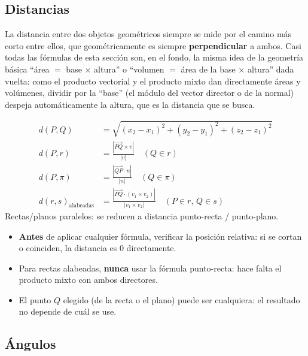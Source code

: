 \documentclass[11pt,a4paper]{article}
\begin{document}
\subsection{Distancias}

\begin{intuicion}
La distancia entre dos objetos geométricos siempre se mide por el camino más corto entre
ellos, que geométricamente es siempre \textbf{perpendicular} a ambos. Casi todas las
fórmulas de esta sección son, en el fondo, la misma idea de la geometría básica ``área
$=$ base $\times$ altura'' o ``volumen $=$ área de la base $\times$ altura'' dada vuelta:
como el producto vectorial y el producto mixto dan directamente áreas y volúmenes,
dividir por la ``base'' (el módulo del vector director o de la normal) despeja
automáticamente la altura, que es la distancia que se busca.
\end{intuicion}

\begin{teoria}[Fórmulas]
\begin{align*}
d(P,Q)&=\sqrt{(x_2-x_1)^2+(y_2-y_1)^2+(z_2-z_1)^2}\\
d(P,r)&=\frac{|\overrightarrow{PQ}\times v|}{|v|}\quad(Q\in r)\\
d(P,\pi)&=\frac{|\overrightarrow{QP}\cdot n|}{|n|}\quad(Q\in\pi)\\
d(r,s)_{\text{alabeadas}}&=\frac{|\overrightarrow{PQ}\cdot(v_1\times v_2)|}{|v_1\times v_2|}
\quad(P\in r,\,Q\in s)
\end{align*}
Rectas/planos paralelos: se reducen a distancia punto-recta / punto-plano.
\end{teoria}

\begin{atencion}
\begin{itemize}
    \item \textbf{Antes} de aplicar cualquier fórmula, verificar la posición relativa: si
    se cortan o coinciden, la distancia es $0$ directamente.
    \item Para rectas alabeadas, \textbf{nunca} usar la fórmula punto-recta: hace falta el
    producto mixto con ambos directores.
    \item El punto $Q$ elegido (de la recta o el plano) puede ser cualquiera: el resultado
    no depende de cuál se use.
\end{itemize}
\end{atencion}

\subsection{Ángulos}
\end{document}
